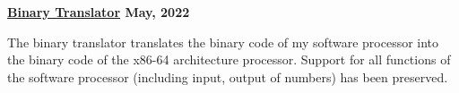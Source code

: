 \textbf{\href{https://github.com/jirol9xa/binaryTranslator} {Binary Translator} \hfill May, 2022}\par

\begin{itemize}
	The binary translator translates the binary code of my software processor into the binary code of the x86-64 architecture processor. Support for all functions of the software processor (including input, output of numbers) has been preserved.
\end{itemize}\par